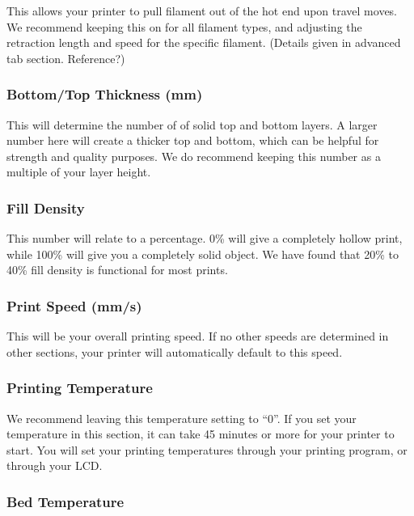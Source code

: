 This allows your printer to pull filament out of the hot end upon travel moves. We recommend keeping this on for all filament types, and adjusting the retraction length and speed for the specific filament. (Details given in advanced tab section. Reference?)

\subsubsection{Bottom/Top Thickness (mm)}

This will determine the number of of solid top and bottom layers. A larger number here will create a thicker top and bottom, which can be helpful for strength and quality purposes. We do recommend keeping this number as a multiple of your layer height.

\subsubsection{Fill Density}

This number will relate to a percentage. 0\% will give a completely hollow print, while 100\% will give you a completely solid object. We have found that 20\% to 40\% fill density is functional for most prints.

\subsubsection{Print Speed (mm/s)}

This will be your overall printing speed. If no other speeds are determined in other sections, your printer will automatically default to this speed. 

\subsubsection{Printing Temperature}

We recommend leaving this temperature setting to “0”. If you set your temperature in this section, it can take 45 minutes or more for your printer to start. You will set your printing temperatures through your printing program, or through your LCD.

\subsubsection{Bed Temperature}

